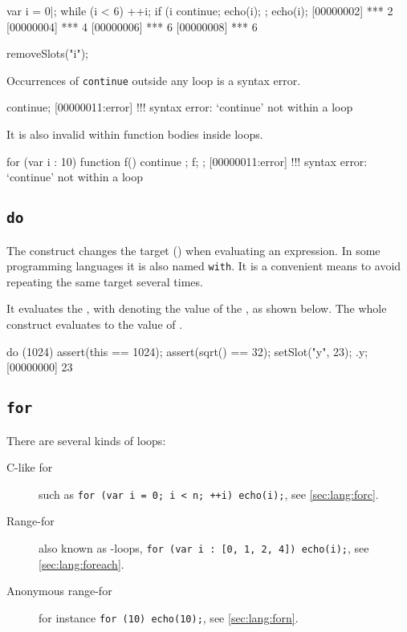 \begin{urbiscript}
var i = 0|;
while (i < 6)
{
  ++i;
  if (i %
    continue;
  echo(i);
};
echo(i);
[00000002] *** 2
[00000004] *** 4
[00000006] *** 6
[00000008] *** 6
\end{urbiscript}
\begin{urbicomment}
removeSlots("i");
\end{urbicomment}

Occurrences of \lstinline{continue} outside any loop is a syntax error.

\begin{urbiscript}
continue;
[00000011:error] !!! syntax error: `continue' not within a loop
\end{urbiscript}

It is also invalid within function bodies inside loops.

\begin{urbiscript}
for (var i : 10)
{
  function f() { continue };
  f;
};
[00000011:error] !!! syntax error: `continue' not within a loop
\end{urbiscript}

\subsection{\lstinline{do}}
\label{sec:lang:do}

The  construct changes the target (\this) when evaluating an
expression.  In some programming languages it is also named
\lstinline{with}.  It is a convenient means to avoid repeating the same
target several times.



It evaluates the , with \this denoting the value of the
, as shown below.  The whole construct evaluates to the
value of .

\begin{urbiscript}
do (1024)
{
  assert(this == 1024);
  assert(sqrt() == 32);
  setSlot("y", 23);
}.y;
[00000000] 23
\end{urbiscript}


\subsection{\lstinline{for}}
\label{sec:lang:for}


There are several kinds of  loops:
\begin{description}
\item[C-like for] such as
  \lstinline|for (var i = 0; i < n; ++i) echo(i);|, see
  \autoref{sec:lang:forc}.
\item[Range-for] also known as -loops,
  \lstinline|for (var i : [0, 1, 2, 4]) echo(i);|, see
  \autoref{sec:lang:foreach}.
\item[Anonymous range-for] for instance \lstinline|for (10) echo(10);|, see
  \autoref{sec:lang:forn}.
\end{description}

